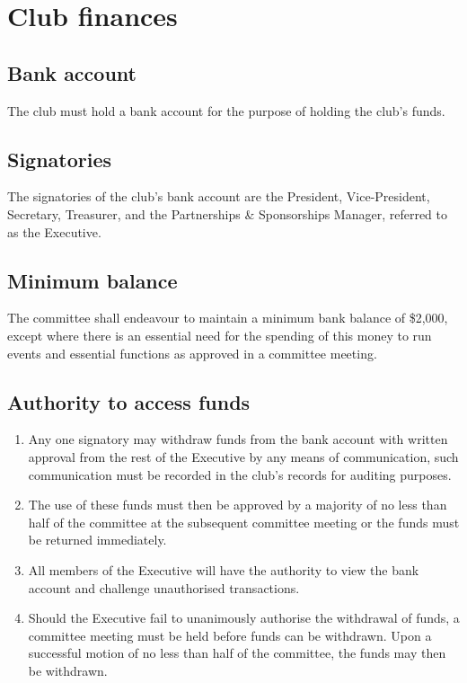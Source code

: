 \documentclass{constitution}
\begin{document}
\section{Club finances}

\subsection{Bank account}
The club must hold a bank account for the purpose of holding the club's funds.

\subsection{Signatories}
The signatories of the club's bank account are the President, Vice-President, Secretary, Treasurer, and the Partnerships \& Sponsorships Manager, referred to as the Executive.

\subsection{Minimum balance}
The committee shall endeavour to maintain a minimum bank balance of \$2,000, except where there is an essential need for the spending of this money to run events and essential functions as approved in a committee meeting.

\subsection{Authority to access funds}
\begin{enumerate}[(1)]
    \item Any one signatory may withdraw funds from the bank account with written approval from the rest of the Executive by any means of communication, such communication must be recorded in the club's records for auditing purposes.
    \item The use of these funds must then be approved by a majority of no less than half of the committee at the subsequent committee meeting or the funds must be returned immediately.
    \item All members of the Executive will have the authority to view the bank account and challenge unauthorised transactions.
    \item Should the Executive fail to unanimously authorise the withdrawal of funds, a committee meeting must be held before funds can be withdrawn. Upon a successful motion of no less than half of the committee, the funds may then be withdrawn.
\end{enumerate}
\end{document}
